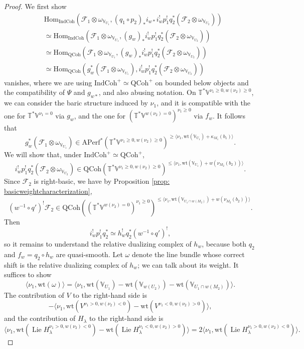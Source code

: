 \documentclass{amsart}
\theoremstyle{definition}
\theoremstyle{remark}
\numberwithin{equation}{section}
\DeclareMathOperator{\Lie}{Lie}
\newcommand{\mc}{\mathcal}
\newcommand{\Hom}{\mathrm{Hom}}
\newcommand{\IndCoh}{\mathrm{IndCoh}}
\newcommand{\QCoh}{\mathrm{QCoh}}
\newcommand{\V}{\mathbb{V}}
\newcommand{\T}{\mathbb{T}}
\newcommand{\Aperf}{\mathrm{APerf}}
\newcommand{\wt}{\mathrm{wt}}
\begin{document}
\begin{proof}
We first show 
\begin{align*}
&\Hom_{\IndCoh}( \mc F_1\otimes \omega_{\V_{U_1}}, (q_1 \circ p_2)_* i_{w*} i_w^! p_1^! q_2^* (\mc F_2\otimes \omega_{\V_{U_2}})) \\
&\simeq
\Hom_{\IndCoh}( \mc F_1\otimes \omega_{\V_{U_1}}, (g_w)_* i_w^! p_1^! q_2^* (\mc F_2\otimes \omega_{\V_{U_2}})) \\
&\simeq
\Hom_{\QCoh}( \mc F_1\otimes \omega_{\V_{U_1}}, (g_w)_* i_w^! p_1^! q_2^* (\mc F_2\otimes \omega_{\V_{U_2}})) \\
&\simeq
\Hom_{\QCoh}(g_w^* (\mc F_1\otimes \omega_{\V_{U_1}}), i_w^! p_1^! q_2^* (\mc F_2\otimes \omega_{\V_{U_2}}))
\end{align*}
vanishes, where we are using $\IndCoh^+\simeq \QCoh^+$ on bounded below objects and the compatibility of $\Psi$ and $g_{w*}$, and also abusing notation. On $\T^* \V^{\nu_1 \geq 0, w(\nu_2)\geq 0}$, we can consider the baric structure induced by $\nu_1$, and it is compatible with the one for $\T^* \V^{\nu_1=0}$ via $g_w$, and the one for $(\T^* \V^{w(\nu_2)=0})^{\nu_1\geq 0}$ via $f_w$. It follows that 
\[
g_w^* (\mc F_1\otimes \omega_{\V_{U_1}})
\in \Aperf^*(\T^* \V^{\nu_1 \geq 0, w(\nu_2)\geq 0})^{\geq \langle \nu_1, \wt(\V_{U_1}) + \kappa_{M_1} (b_1) \rangle}.
\]
We will show that, under $\IndCoh^+\simeq \QCoh^+$, 
\[
i_w^! p_1^! q_2^* (\mc F_2\otimes \omega_{\V_{U_2}}) 
\in \QCoh(\T^* \V^{\nu_1 \geq 0, w(\nu_2)\geq 0})^{\leq \langle \nu_1, \wt(\V_{U_1}) + w(\nu_{M_2} (b_2)) \rangle}. 
\]
Since $\mc F_2$ is right-basic, we have by Proposition \ref{prop: basicweightcharacterization},
\[
(w^{-1}\circ q')^! \mc F_2 \in \QCoh((\T^* \V^{w(\nu_2)=0})^{\nu_1 \geq 0})^{\leq \langle \nu_1, \wt (\V_{U_1\cap w(M_2)}) + w(\nu_{M_2} (b_2))\rangle }.
\]
Then 
\begin{equation*}
    i_w^! p_1^! q_2^* \simeq h^!_wq^{\ast}_2(w^{-1} \circ q')^!,
\end{equation*}
so it remains to understand the relative dualizing complex of $h_w$, because both $q_2$ and $f_w=q_2\circ h_w$ are quasi-smooth. Let $\omega$ denote the line bundle whose correct shift is the relative dualizing complex of $h_w$; we can talk about its weight. It suffices to show
\[
\langle \nu_1, \wt (\omega) \rangle=\langle \nu_1, \wt (\V_{U_1})-\wt (\V_{w(U_2)}) - \wt (\V_{U_1\cap w(M_2)})  \rangle. 
\]
The contribution of $V$ to the right-hand side is
\[
-\langle \nu_1, \wt (V^{\nu_1 >0, w(\nu_2)<0}) - \wt(V^{\nu_1 <0, w(\nu_2)>0})\rangle,
\]
and the contribution of $H_{\lambda}$ to the right-hand side is
\[
\langle \nu_1,  \wt (\Lie H^{\nu_1 > 0, w(\nu_2)<0}_{\lambda})- \wt (\Lie H^{\nu_1 < 0, w(\nu_2) > 0}_{\lambda})\rangle
=2 \langle \nu_1, \wt (\Lie H^{\nu_1 > 0, w(\nu_2)<0}_{\lambda})\rangle.
\]


\end{proof}
\end{document}
